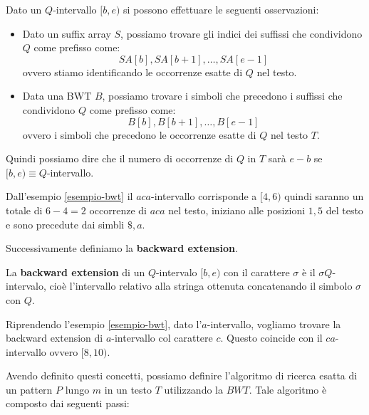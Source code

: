 Dato un $Q$-intervallo $[b, e)$ si possono effettuare le seguenti osservazioni:
\begin{itemize}
    \item Dato un suffix array $S$, possiamo trovare gli indici dei suffissi
          che condividono $Q$ come prefisso come:
          \begin{equation}
              SA[b], SA[b + 1], \dots, SA[e - 1]
          \end{equation}
          ovvero stiamo identificando le occorrenze esatte di $Q$ nel testo.
    \item Data una BWT $B$, possiamo trovare i simboli che precedono i suffissi
          che condividono $Q$ come prefisso come:
          \begin{equation}
              B[b], B[b + 1], \dots, B[e - 1]
          \end{equation}
          ovvero i simboli che precedono le occorrenze esatte di $Q$ nel testo
          $T$.
\end{itemize}
Quindi possiamo dire che il numero di occorrenze di $Q$ in $T$ sarà $e-b$ se
$[b,e) \equiv Q$-intervallo.
\begin{esempio}
    Dall'esempio \ref{esempio-bwt} il $aca$-intervallo corrisponde a $[4,6)$
    quindi saranno un totale di $6 - 4= 2$ occorrenze di $aca$ nel testo,
    iniziano alle posizioni $1,5$ del testo e sono precedute dai simbli $\$,a$.
\end{esempio}
Successivamente definiamo la \textbf{backward extension}.
\begin{definizione}
    La \textbf{backward extension} di un $Q$-intervalo $[b,e)$ con il carattere
    $\sigma$ è il $\sigma Q$-intervalo, cioè l'intervallo relativo alla stringa
    ottenuta concatenando il simbolo $\sigma$ con $Q$.
\end{definizione}
\begin{esempio}
    Riprendendo l'esempio \ref{esempio-bwt}, dato l'$a$-intervallo, vogliamo
    trovare la backward extension di $a$-intervallo col carattere $c$. Questo
    coincide con il  $ca$-intervallo ovvero $[8,10)$.
\end{esempio}
Avendo definito questi concetti, possiamo definire l'algoritmo di ricerca esatta
di un pattern $P$ lungo $m$ in un testo $T$ utilizzando la $BWT$. Tale algoritmo
è composto dai seguenti passi:
